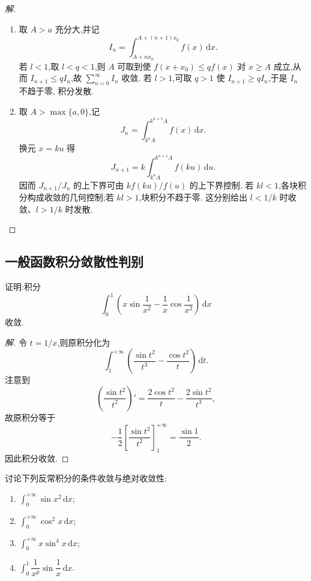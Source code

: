 \documentclass[../../数学分析培优讲义(答案版).tex]{subfiles}
\begin{document}
\begin{proof}[解]
\begin{enumerate}[label=(\arabic*)]
    \item 取 $A>a$ 充分大,并记
    \[
        I_n=\int_{A+nx_0}^{A+(n+1)x_0}f(x)\,\mathrm{d}x.
    \]
    若 $l<1$,取 $l<q<1$,则 $A$ 可取到使
    $f(x+x_0)\leq qf(x)$ 对 $x\geq A$ 成立,从而
    $I_{n+1}\leq qI_n$,故 $\displaystyle\sum\limits_{n=0}^{\infty}I_n$ 收敛.
    若 $l>1$,可取 $q>1$ 使 $I_{n+1}\geq qI_n$,于是 $I_n$ 不趋于零,
    积分发散.

    \item 取 $A>\max\{a,0\}$,记
    \[
        J_n=\int_{k^nA}^{k^{n+1}A}f(x)\,\mathrm{d}x.
    \]
    换元 $x=ku$ 得
    \[
        J_{n+1}=k\int_{k^nA}^{k^{n+1}A}f(ku)\,\mathrm{d}u.
    \]
    因而 $J_{n+1}/J_n$ 的上下界可由 $k f(ku)/f(u)$ 的上下界控制.
    若 $kl<1$,各块积分构成收敛的几何控制;若 $kl>1$,块积分不趋于零.
    这分别给出 $l<1/k$ 时收敛、$l>1/k$ 时发散.
\end{enumerate}
\end{proof}

\subsection{一般函数积分敛散性判别}

\begin{example}
证明:积分
\[
    \int_0^1\left(x\sin\dfrac{1}{x^2}-\dfrac{1}{x}\cos\dfrac{1}{x^2}\right)\,\mathrm{d}x
\]
收敛.
\end{example}

\begin{proof}[解]
令 $t=1/x$,则原积分化为
\[
    \int_1^{+\infty}\left(\dfrac{\sin t^2}{t^3}-\dfrac{\cos t^2}{t}\right)\,\mathrm{d}t.
\]
注意到
\[
    \left(\dfrac{\sin t^2}{t^2}\right)'
    =\dfrac{2\cos t^2}{t}-\dfrac{2\sin t^2}{t^3},
\]
故原积分等于
\[
    -\dfrac{1}{2}\left[\dfrac{\sin t^2}{t^2}\right]_1^{+\infty}
    =\dfrac{\sin1}{2}.
\]
因此积分收敛.
\end{proof}

\begin{example}
讨论下列反常积分的条件收敛与绝对收敛性:
\begin{enumerate}[label=(\arabic*)]
    \item $\displaystyle\int_0^{+\infty}\sin x^2\,\mathrm{d}x$;
    \item $\displaystyle\int_0^{+\infty}\cos^2x\,\mathrm{d}x$;
    \item $\displaystyle\int_0^{+\infty}x\sin^4x\,\mathrm{d}x$;
    \item $\displaystyle\int_0^1\dfrac{1}{x^p}\sin\dfrac{1}{x}\,\mathrm{d}x$.
\end{enumerate}
\end{example}
\end{document}
